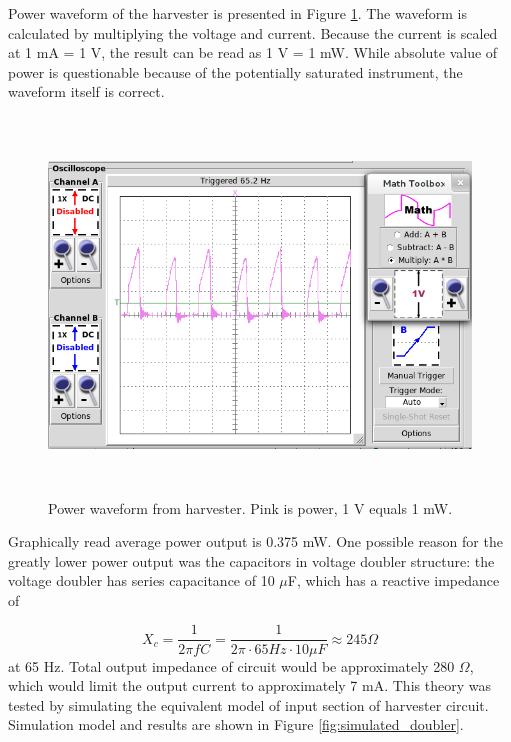 Power waveform of the harvester is presented in Figure \ref{fig:inductive_power_65}. The waveform is calculated by multiplying the voltage and current. Because the current is scaled at 1 mA = 1 V, the result can be read as 1 V = 1 mW. While absolute value of power is questionable because of the potentially saturated instrument, the waveform itself is correct.  

\begin{figure}[htb]
\begin{center}
\includegraphics[height=10cm]{images/own_measurement/generator_shaker/inductive_td_harvesting_power_65Hz_ferro.png}
\end{center}
\caption{\label{fig:inductive_power_65} Power waveform from harvester. Pink is power, 1 V equals 1 mW.}
\end{figure}

Graphically read average power output is 0.375 mW. One possible reason for the greatly lower power output was the capacitors in voltage doubler structure: the voltage doubler has series capacitance of 10 $\mu$F, which has a reactive impedance of

\begin{equation}
  X_c = \frac{1}{2 \pi f C}  = \frac{1}{2 \pi \cdot 65 Hz \cdot 10\mu F} \approx 245 \Omega
\end{equation}
at 65 Hz. Total output impedance of circuit would be approximately 280 $\Omega$, which would limit the output current to approximately 7 mA. This theory was tested by simulating the equivalent model of input section of harvester circuit. Simulation model and results are shown in Figure \ref{fig:simulated_doubler}.

